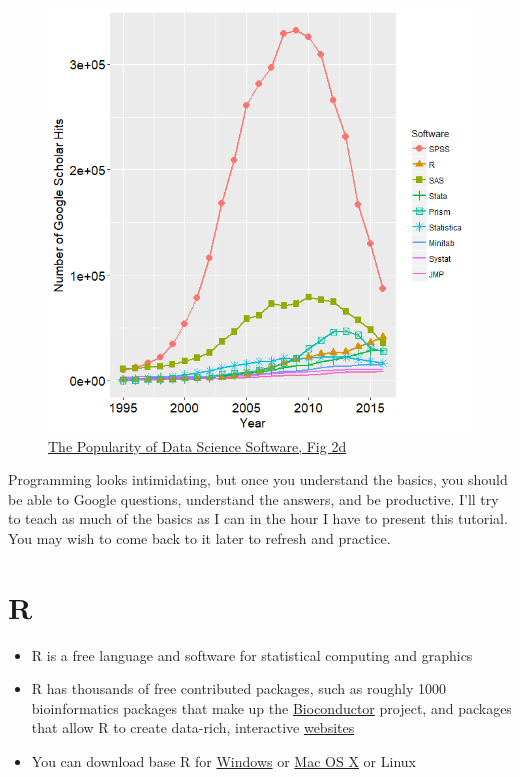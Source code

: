 \documentclass[]{article}
\providecommand{\tightlist}{%
  \setlength{\itemsep}{0pt}\setlength{\parskip}{0pt}}
\begin{document}
\begin{figure}
\centering
\includegraphics{Fig_2d_ScholarlyImpact2016.png}
\caption{\href{http://r4stats.com/articles/popularity/}{The Popularity
of Data Science Software, Fig 2d}}
\end{figure}

Programming looks intimidating, but once you understand the basics, you
should be able to Google questions, understand the answers, and be
productive. I'll try to teach as much of the basics as I can in the hour
I have to present this tutorial. You may wish to come back to it later
to refresh and practice.

\section{R}\label{r}

\begin{itemize}
\tightlist
\item
  R is a free language and software for statistical computing and
  graphics\\
\item
  R has thousands of free contributed packages, such as roughly 1000
  bioinformatics packages that make up the
  \href{https://www.bioconductor.org/}{Bioconductor} project, and
  packages that allow R to create data-rich, interactive
  \href{https://shiny.rstudio.com/gallery/}{websites}\\
\item
  You can download base R for
  \href{https://cloud.r-project.org/bin/windows/base/}{Windows} or
  \href{https://cloud.r-project.org/bin/macosx/}{Mac OS X} or Linux
\end{itemize}
\end{document}

